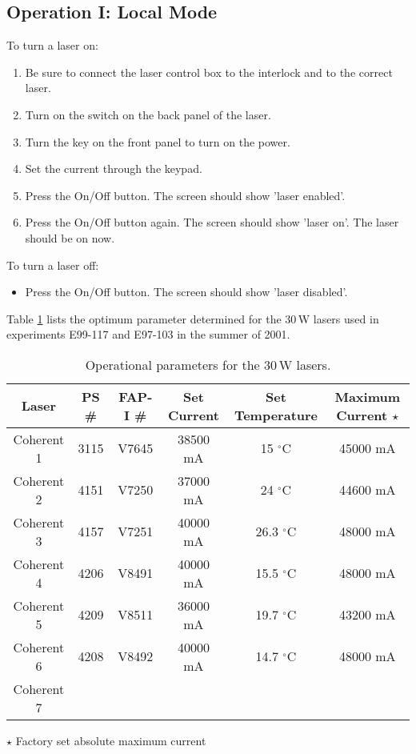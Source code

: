 \subsection{Operation I: Local Mode}
To turn a laser on:
\begin{enumerate} \setlength{\parskip}{0ex}
\item Be sure to connect the laser control box to the interlock and to
the correct laser.
\item Turn on the switch on the back panel of the laser.
\item Turn the key on the front panel to turn on the power.
\item Set the current through the keypad.
\item Press the On/Off button.  The screen should show 'laser enabled'.
\item Press the On/Off button again.  The screen should show 'laser on'. The 
      laser should be on now.
\end{enumerate}
To turn a laser off:
\begin{itemize}
\item Press the On/Off button.  The screen should show 'laser disabled'.
\end{itemize}

Table \ref{tab:laserparam} lists the optimum parameter
determined for the 30\,W lasers used in experiments E99-117 and E97-103
in the summer of 2001.

\begin{table}[hbp]
\begin{center}
\begin{tabular}{|c|c|c|c|c|c|}\hline

 Laser        & PS \#  &  FAP-I \#  &  Set Current & Set Temperature & Maximum Current $\star$\\ \hline
 Coherent 1   & 3115   &  V7645     & 38500 mA  &   15 $^\circ$C     &  45000 mA\\ \hline
 Coherent 2   & 4151   &  V7250     & 37000 mA  &   24 $^\circ$C     & 44600 mA    \\ \hline
 Coherent 3   & 4157   &  V7251     & 40000 mA  &   26.3 $^\circ$C   & 48000 mA    \\ \hline
 Coherent 4   & 4206   &  V8491     & 40000 mA  &   15.5 $^\circ$C   & 48000 mA    \\ \hline
 Coherent 5   & 4209   &  V8511     & 36000 mA  &   19.7 $^\circ$C   & 43200 mA    \\ \hline
 Coherent 6   & 4208   &  V8492     & 40000 mA  &   14.7 $^\circ$C   & 48000 mA    \\ \hline
 Coherent 7  && & &  &       \\ \hline
\end{tabular}
 $\star$ Factory set absolute maximum current 
\end{center}
\caption{Operational parameters for the 30\,W lasers.}
\label{tab:laserparam}
\end{table}



